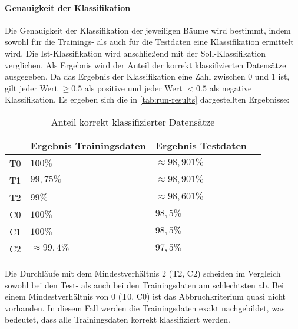 \paragraph{Genauigkeit der Klassifikation}
Die Genauigkeit der Klassifikation der jeweiligen Bäume wird bestimmt,
indem sowohl für die Trainings- als auch für die Testdaten eine Klassifikation ermittelt wird.
Die Ist-Klassifikation wird anschließend mit der Soll-Klassifikation verglichen.
Als Ergebnis wird der Anteil der korrekt klassifizierten Datensätze ausgegeben.
Da das Ergebnis der Klassifikation eine Zahl zwischen $0$ und $1$ ist,
gilt jeder Wert $\geq 0.5$ als positive und jeder Wert $< 0.5$ als negative Klassifikation.
Es ergeben sich die in \autoref{tab:run-results} dargestellten Ergebnisse:

\useunder{\uline}{\ul}{}
\begin{table}[h]
    \begin{center}
        \begin{tabular}{|l|l|l|l|}
        \hline
                                & {\ul \textbf{Ergebnis Trainingsdaten}} & {\ul \textbf{Ergebnis Testdaten}} \\
            \hline
            T0                  & $100\%$                                & $\approx 98,901\%$                  \\
            \hline
            T1                  & $99,75\%$                              & $\approx 98,901\%$                  \\
            \hline
            T2                  & $99\%$                                 & $\approx 98,601\%$                  \\
            \hline
            \hline
            C0                  & $100\%$                                & $98,5\%$                  \\
            \hline
            C1                  & $100\%$                                & $98,5\%$                  \\
            \hline
            C2                  & $\approx 99,4\%$                       & $97,5\%$                  \\
            \hline
        \end{tabular}
        \caption{Anteil korrekt klassifizierter Datensätze}
        \label{tab:run-results}
    \end{center}
\end{table}

Die Durchläufe mit dem Mindestverhältnis $2$ (T2, C2) scheiden im Vergleich sowohl bei den Test- als auch bei den Trainingsdaten am schlechtsten ab.
Bei einem Mindestverhältnis von $0$ (T0, C0) ist das Abbruchkriterium quasi nicht vorhanden.
In diesem Fall werden die Trainingsdaten exakt nachgebildet,
was bedeutet, dass alle Trainingsdaten korrekt klassifiziert werden.

